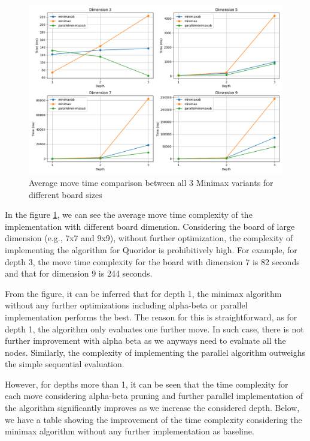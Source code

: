 \begin{figure}[!ht]
    \centering
    \includegraphics[width=\linewidth]{../img/performance.png}
    \caption{Average move time comparison between all 3 Minimax variants for different board sizes}
    \label{fig:minimax_performance_comp}
\end{figure}

In the figure \ref{fig:minimax_performance_comp}, we can see the average move time complexity of the implementation with different board dimension. Considering the board of large dimension (e.g., 7x7 and 9x9), without further optimization, the complexity of implementing the algorithm for Quoridor is prohibitively high. For example, for depth 3, the move time complexity for the board with dimension 7 is 82 seconds and that for dimension 9 is 244 seconds.

From the figure, it can be inferred that for depth 1, the minimax algorithm without any further optimizations including alpha-beta or parallel implementation performs the best. The reason for this is straightforward, as for depth 1, the algorithm only evaluates one further move. In such case, there is not further improvement with alpha beta as we anyways need to evaluate all the nodes. Similarly, the complexity of implementing the parallel algorithm outweighs the simple sequential evaluation.

However, for depths more than 1, it can be seen that the time complexity for each move considering alpha-beta pruning and further parallel implementation of the algorithm significantly improves as we increase the considered depth. Below, we have a table showing the improvement of the time complexity considering the minimax algorithm without any further implementation as baseline.

